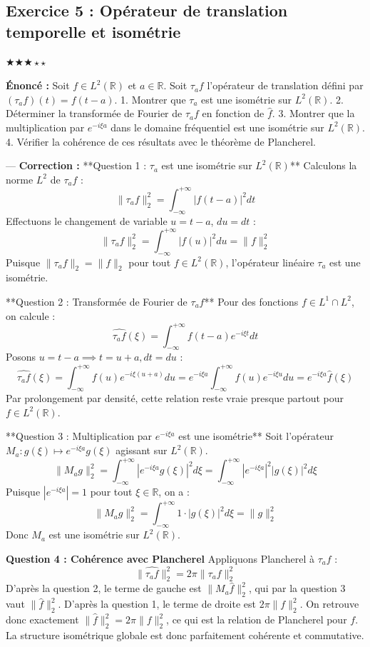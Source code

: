 \documentclass[11pt,a4paper]{article}
\begin{document}
\subsection*{Exercice 5 : Opérateur de translation temporelle et isométrie}
$\bigstar\bigstar\bigstar\star\star$

\textbf{Énoncé :}
Soit $f \in L^2(\mathbb{R})$ et $a \in \mathbb{R}$. Soit $\tau_a f$ l'opérateur de translation défini par $(\tau_a f)(t) = f(t-a)$.
1. Montrer que $\tau_a$ est une isométrie sur $L^2(\mathbb{R})$.
2. Déterminer la transformée de Fourier de $\tau_a f$ en fonction de $\hat{f}$.
3. Montrer que la multiplication par $e^{-i\xi a}$ dans le domaine fréquentiel est une isométrie sur $L^2(\mathbb{R})$.
4. Vérifier la cohérence de ces résultats avec le théorème de Plancherel.

---
\textbf{Correction :}
**Question 1 : $\tau_a$ est une isométrie sur $L^2(\mathbb{R})$**
Calculons la norme $L^2$ de $\tau_a f$ :
$$ \|\tau_a f\|_2^2 = \int_{-\infty}^{+\infty} |f(t-a)|^2 dt $$
Effectuons le changement de variable $u = t - a$, $du = dt$ :
$$ \|\tau_a f\|_2^2 = \int_{-\infty}^{+\infty} |f(u)|^2 du = \|f\|_2^2 $$
Puisque $\|\tau_a f\|_2 = \|f\|_2$ pour tout $f \in L^2(\mathbb{R})$, l'opérateur linéaire $\tau_a$ est une isométrie.

**Question 2 : Transformée de Fourier de $\tau_a f$**
Pour des fonctions $f \in L^1 \cap L^2$, on calcule :
$$ \widehat{\tau_a f}(\xi) = \int_{-\infty}^{+\infty} f(t-a) e^{-i\xi t} dt $$
Posons $u = t - a \implies t = u + a, dt = du$ :
$$ \widehat{\tau_a f}(\xi) = \int_{-\infty}^{+\infty} f(u) e^{-i\xi (u+a)} du = e^{-i\xi a} \int_{-\infty}^{+\infty} f(u) e^{-i\xi u} du = e^{-i\xi a} \hat{f}(\xi) $$
Par prolongement par densité, cette relation reste vraie presque partout pour $f \in L^2(\mathbb{R})$.

**Question 3 : Multiplication par $e^{-i\xi a}$ est une isométrie**
Soit l'opérateur $M_a : g(\xi) \mapsto e^{-i\xi a} g(\xi)$ agissant sur $L^2(\mathbb{R})$.
$$ \|M_a g\|_2^2 = \int_{-\infty}^{+\infty} |e^{-i\xi a} g(\xi)|^2 d\xi = \int_{-\infty}^{+\infty} |e^{-i\xi a}|^2 |g(\xi)|^2 d\xi $$
Puisque $|e^{-i\xi a}| = 1$ pour tout $\xi \in \mathbb{R}$, on a :
$$ \|M_a g\|_2^2 = \int_{-\infty}^{+\infty} 1 \cdot |g(\xi)|^2 d\xi = \|g\|_2^2 $$
Donc $M_a$ est une isométrie sur $L^2(\mathbb{R})$.

\textbf{Question 4 : Cohérence avec Plancherel}
Appliquons Plancherel à $\tau_a f$ :
$$ \|\widehat{\tau_a f}\|_2^2 = 2\pi \|\tau_a f\|_2^2 $$
D'après la question 2, le terme de gauche est $\|M_a \hat{f}\|_2^2$, qui par la question 3 vaut $\|\hat{f}\|_2^2$.
D'après la question 1, le terme de droite est $2\pi \|f\|_2^2$.
On retrouve donc exactement $\|\hat{f}\|_2^2 = 2\pi \|f\|_2^2$, ce qui est la relation de Plancherel pour $f$. La structure isométrique globale est donc parfaitement cohérente et commutative.
\end{document}
